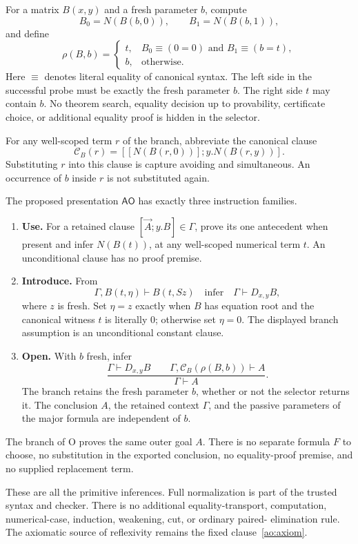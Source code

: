 For a matrix $B(x,y)$ and a fresh parameter $b$, compute
\[
 B_0=N(B(b,0)),\qquad B_1=N(B(b,1)),
\]
and define
\[
 \rho(B,b)=
 \begin{cases}
 t,& B_0\equiv(0=0)\text{ and }B_1\equiv(b=t),\\
 b,&\text{otherwise}.
 \end{cases}
 \tag{Selector}\label{ao:selector}
\]
Here $\equiv$ denotes literal equality of canonical syntax.  The left
side in the successful probe must be exactly the fresh parameter $b$.
The right side $t$ may contain $b$.  No theorem search, equality decision
up to provability, certificate choice, or additional equality proof is
hidden in the selector.

For any well-scoped term $r$ of the branch, abbreviate the canonical clause
\[
 \mathcal C_B(r)=[[N(B(r,0))];y.N(B(r,y))].
\]
Substituting $r$ into this clause is capture avoiding and simultaneous.
An occurrence of $b$ inside $r$ is not substituted again.

The proposed presentation $\mathsf{AO}$ has exactly three instruction
families.
\begin{enumerate}
\item \textbf{Use.} For a retained clause $[\vec A;y.B]\in\Gamma$,
prove its one antecedent when present and infer $N(B(t))$, at any
well-scoped numerical term $t$.  An unconditional clause has no proof
premise.
\item \textbf{Introduce.} From
\[
       \Gamma,B(t,\eta)\vdash B(t,Sz)
       \quad\text{infer}\quad
       \Gamma\vdash D_{x,y}B,
 \tag{I}\label{ao:intro}
\]
where $z$ is fresh.  Set $\eta=z$ exactly when $B$ has equation root and
the canonical witness $t$ is literally $0$; otherwise set $\eta=0$.
The displayed branch assumption is an unconditional constant clause.
\item \textbf{Open.} With $b$ fresh, infer
\[
 \frac{\Gamma\vdash D_{x,y}B\qquad
       \Gamma,\mathcal C_B(\rho(B,b))\vdash A}
      {\Gamma\vdash A}.
 \tag{O}\label{ao:open}
\]
The branch retains the fresh parameter $b$, whether or not the selector
returns it.  The conclusion $A$, the retained context $\Gamma$, and the
passive parameters of the major formula are independent of $b$.
\end{enumerate}
The branch of O proves the same outer goal $A$.  There is no separate
formula $F$ to choose, no substitution in the exported conclusion, no
equality-proof premise, and no supplied replacement term.

These are all the primitive inferences.  Full normalization is part of the
trusted syntax and checker.  There is no additional equality-transport,
computation, numerical-case, induction, weakening, cut, or ordinary paired-
elimination rule.  The axiomatic source of reflexivity remains the fixed
clause~\eqref{ao:axiom}.

